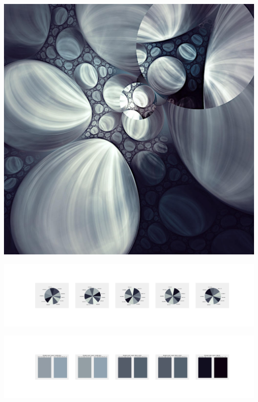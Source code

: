 \documentclass[11pt]{article}
\begin{document}
\begin{landscape}
    \begin{center}
    \includegraphics[width=\textwidth]{./nbimg/file (2).jpg}
    \end{center}

    \begin{center}
    \includegraphics[width=250mm]{./nbimg/pie-111.jpg}
    \end{center}

    \begin{center}
    \includegraphics[width=250mm]{./nbimg/peak-111.jpg}
    \end{center}
    


\end{landscape}
\end{document}
